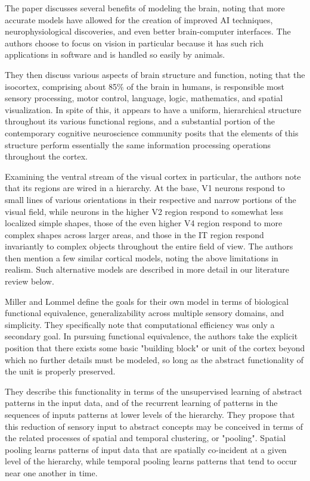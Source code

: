 \documentclass[a4paper,10pt]{article}
\begin{document}
The paper discusses several benefits of modeling the brain, noting that more accurate models have
allowed for the creation of improved AI techniques, neurophysiological discoveries, and even better
brain-computer interfaces. The authors choose to focus on vision in particular because it has such
rich applications in software and is handled so easily by animals.

They then discuss various aspects of brain structure and function, noting that the isocortex,
comprising about 85\% of the brain in humans, is responsible most sensory processing, motor control,
language, logic, mathematics, and spatial visualization. In spite of this, it appears to have a
uniform, hierarchical structure throughout its various functional regions, and a substantial portion
of the contemporary cognitive neuroscience community posits that the elements of this structure
perform essentially the same information processing operations throughout the cortex.

Examining the ventral stream of the visual cortex in particular, the authors note that its regions
are wired in a hierarchy. At the base, V1 neurons respond to small lines of various orientations in
their respective and narrow portions of the visual field, while neurons in the higher V2 region
respond to somewhat less localized simple shapes, those of the even higher V4 region respond to more
complex shapes across larger areas, and those in the IT region respond invariantly to complex
objects throughout the entire field of view. The authors then mention a few similar cortical models,
noting the above limitations in realism. Such alternative models are described in more detail in our
literature review below.

Miller and Lommel define the goals for their own model in terms of biological functional
equivalence, generalizability across multiple sensory domains, and simplicity. They specifically
note that computational efficiency was only a secondary goal. In pursuing functional equivalence,
the authors take the explicit position that there exists some basic "building block" or unit of the
cortex beyond which no further details must be modeled, so long as the abstract functionality of the
unit is properly preserved.

They describe this functionality in terms of the unsupervised learning of abstract patterns in the
input data, and of the recurrent learning of patterns in the sequences of inputs patterns at lower
levels of the hierarchy. They propose that this reduction of sensory input to abstract concepts may
be conceived in terms of the related processes of spatial and temporal clustering, or "pooling".
Spatial pooling learns patterns of input data that are spatially co-incident at a given level of the
hierarchy, while temporal pooling learns patterns that tend to occur near one another in time.
\end{document}
